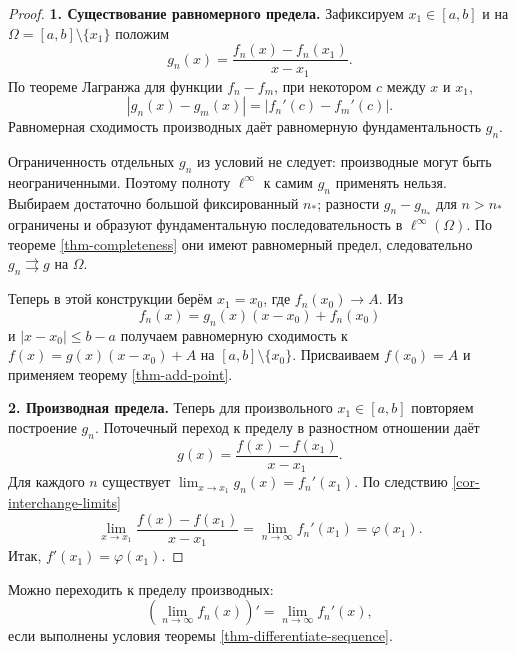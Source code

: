 \begin{proof}

\textbf{1. Существование равномерного предела.} Зафиксируем \(x_1\in[a,b]\) и на \(\Omega=[a,b]\setminus\{x_1\}\) положим \[
g_n(x)=\frac{f_n(x)-f_n(x_1)}{x-x_1}.
\] По теореме Лагранжа для функции \(f_n-f_m\), при некотором \(c\) между \(x\) и \(x_1\), \[
|g_n(x)-g_m(x)|=|f_n'(c)-f_m'(c)|.
\] Равномерная сходимость производных даёт равномерную фундаментальность \(g_n\).

Ограниченность отдельных \(g_n\) из условий не следует: производные могут быть неограниченными. Поэтому полноту \(\ell^\infty\) к самим \(g_n\) применять нельзя. Выбираем достаточно большой фиксированный \(n_*\); разности \(g_n-g_{n_*}\) для \(n>n_*\) ограничены и образуют фундаментальную последовательность в \(\ell^\infty(\Omega)\). По теореме \ref{thm-completeness} они имеют равномерный предел, следовательно \(g_n\rightrightarrows g\) на \(\Omega\).

Теперь в этой конструкции берём \(x_1=x_0\), где \(f_n(x_0)\to A\). Из \[
f_n(x)=g_n(x)(x-x_0)+f_n(x_0)
\] и \(|x-x_0|\le b-a\) получаем равномерную сходимость к \(f(x)=g(x)(x-x_0)+A\) на \([a,b]\setminus\{x_0\}\). Присваиваем \(f(x_0)=A\) и применяем теорему \ref{thm-add-point}.

\textbf{2. Производная предела.} Теперь для произвольного \(x_1\in[a,b]\) повторяем построение \(g_n\). Поточечный переход к пределу в разностном отношении даёт \[
g(x)=\frac{f(x)-f(x_1)}{x-x_1}.
\] Для каждого \(n\) существует \(\lim_{x\to x_1}g_n(x)=f_n'(x_1)\). По следствию \ref{cor-interchange-limits} \[
\lim_{x\to x_1}\frac{f(x)-f(x_1)}{x-x_1}
=\lim_{n\to\infty}f_n'(x_1)=\varphi(x_1).
\] Итак, \(f'(x_1)=\varphi(x_1)\).

\end{proof}

Можно переходить к пределу производных: \[
\left(\lim_{n\to\infty}f_n(x)\right)'
=\lim_{n\to\infty}f_n'(x),
\] если выполнены условия теоремы \ref{thm-differentiate-sequence}.
